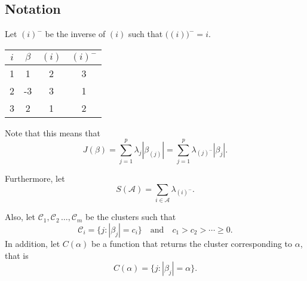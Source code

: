 \subsection{Notation}\label{sec:notation}

Let \((i)^{-}\) be the inverse of \((i)\) such that
\(\big((i)\big)^- = i\).
\begin{example}
  \begin{tabular}{cccc}
    \toprule
    \(i\) & \(\beta\) & \((i)\) & \((i)^-\) \\
    \midrule
    1     & 1         & 2       & 3         \\
    2     & -3        & 3       & 1         \\
    3     & 2         & 1       & 2         \\
    \bottomrule
  \end{tabular}
\end{example}
Note that this means that
\[
  J(\beta) = \sum_{j=1}^p \lambda_j |\beta_{(j)}|
           = \sum_{j=1}^p \lambda_{(j)^-}|\beta_j|.
\]

Furthermore, let
\[
  S(\mathcal{A}) = \sum_{i \in \mathcal{A}} \lambda_{(i)^-}.
\]

Also, let \(\mathcal{C}_1, \mathcal{C}_2\, \dots, \mathcal{C}_m\) be the
clusters such that
\[
  \mathcal{C}_i = \{j : |\beta_j| = c_i\} \quad \text{and} \quad
  c_1 > c_2 > \cdots \geq 0.
\]
In addition, let \(C(\alpha)\) be a function that returns the
cluster corresponding to \(\alpha\), that is
\[
  C(\alpha) = \{j : |\beta_j| = \alpha\}.
\]




